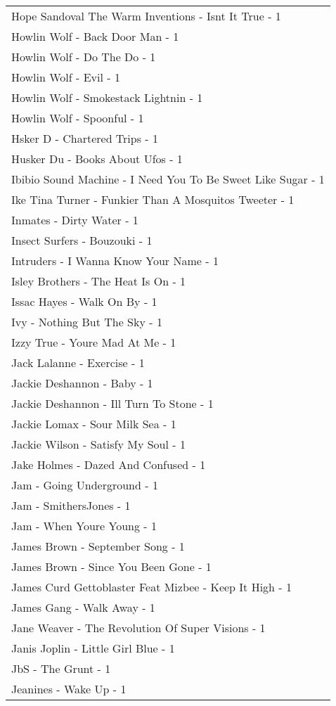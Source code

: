 \documentclass[
]{article}
\begin{document}
\begin{longtable}{l}
Hope Sandoval The Warm Inventions - Isnt It True - 1 \\ 
Howlin Wolf - Back Door Man - 1 \\ 
Howlin Wolf - Do The Do - 1 \\ 
Howlin Wolf - Evil - 1 \\ 
Howlin Wolf - Smokestack Lightnin - 1 \\ 
Howlin Wolf - Spoonful - 1 \\ 
Hsker D - Chartered Trips - 1 \\ 
Husker Du - Books About Ufos - 1 \\ 
Ibibio Sound Machine - I Need You To Be Sweet Like Sugar - 1 \\ 
Ike Tina Turner - Funkier Than A Mosquitos Tweeter - 1 \\ 
Inmates - Dirty Water - 1 \\ 
Insect Surfers - Bouzouki - 1 \\ 
Intruders - I Wanna Know Your Name - 1 \\ 
Isley Brothers - The Heat Is On - 1 \\ 
Issac Hayes - Walk On By - 1 \\ 
Ivy - Nothing But The Sky - 1 \\ 
Izzy True - Youre Mad At Me - 1 \\ 
Jack Lalanne - Exercise - 1 \\ 
Jackie Deshannon - Baby - 1 \\ 
Jackie Deshannon - Ill Turn To Stone - 1 \\ 
Jackie Lomax - Sour Milk Sea - 1 \\ 
Jackie Wilson - Satisfy My Soul - 1 \\ 
Jake Holmes - Dazed And Confused - 1 \\ 
Jam - Going Underground - 1 \\ 
Jam - SmithersJones - 1 \\ 
Jam - When Youre Young - 1 \\ 
James Brown - September Song - 1 \\ 
James Brown - Since You Been Gone - 1 \\ 
James Curd Gettoblaster Feat Mizbee - Keep It High - 1 \\ 
James Gang - Walk Away - 1 \\ 
Jane Weaver - The Revolution Of Super Visions - 1 \\ 
Janis Joplin - Little Girl Blue - 1 \\ 
JbS - The Grunt - 1 \\ 
Jeanines - Wake Up - 1 \\ 

\end{longtable}
\end{document}
